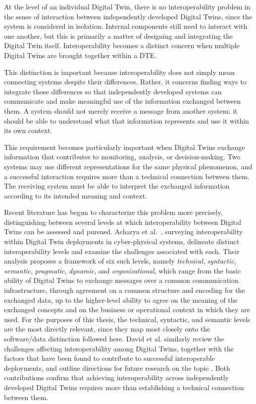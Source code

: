 At the level of an individual Digital Twin, there is no interoperability problem in the sense of interaction between independently developed Digital Twins, since the system is considered in isolation. Internal components still need to interact with one another, but this is primarily a matter of designing and integrating the Digital Twin itself. Interoperability becomes a distinct concern when multiple Digital Twins are brought together within a DTE.

This distinction is important because interoperability does not simply mean connecting systems despite their differences. Rather, it concerns finding ways to integrate those differences so that independently developed systems can communicate and make meaningful use of the information exchanged between them. A system should not merely receive a message from another system; it should be able to understand what that information represents and use it within its own context.

This requirement becomes particularly important when Digital Twins exchange information that contributes to monitoring, analysis, or decision-making. Two systems may use different representations for the same physical phenomenon, and a successful interaction requires more than a technical connection between them. The receiving system must be able to interpret the exchanged information according to its intended meaning and context.

Recent literature has begun to characterize this problem more precisely, distinguishing between several levels at which interoperability between Digital Twins can be assessed and pursued. Acharya et al.~\cite{acharya2024interoperability}, surveying interoperability within Digital Twin deployments in cyber-physical systems, delineate distinct interoperability levels and examine the challenges associated with each. Their analysis proposes a framework of six such levels, namely \textit{technical}, \textit{syntactic}, \textit{semantic}, \textit{pragmatic}, \textit{dynamic}, and \textit{organizational}, which range from the basic ability of Digital Twins to exchange messages over a common communication infrastructure, through agreement on a common structure and encoding for the exchanged data, up to the higher-level ability to agree on the meaning of the exchanged concepts and on the business or operational context in which they are used. For the purposes of this thesis, the technical, syntactic, and semantic levels are the most directly relevant, since they map most closely onto the software/data distinction followed here.
%
David et al. similarly review the challenges affecting interoperability among Digital Twins, together with the factors that have been found to contribute to successful interoperable deployments, and outline directions for future research on the topic \cite{david2024interoperability}. Both contributions confirm that achieving interoperability across independently developed Digital Twins requires more than establishing a technical connection between them.

